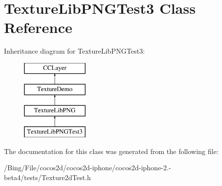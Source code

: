 \hypertarget{interface_texture_lib_p_n_g_test3}{\section{Texture\-Lib\-P\-N\-G\-Test3 Class Reference}
\label{interface_texture_lib_p_n_g_test3}
}
Inheritance diagram for Texture\-Lib\-P\-N\-G\-Test3\-:\begin{figure}[H]
\begin{center}
\leavevmode
\includegraphics[height=4.000000cm]{interface_texture_lib_p_n_g_test3}
\end{center}
\end{figure}


The documentation for this class was generated from the following file\-:\begin{DoxyCompactItemize}
\item 
/\-Bing/\-File/cocos2d/cocos2d-\/iphone/cocos2d-\/iphone-\/2.-\/beta4/tests/Texture2d\-Test.\-h\end{DoxyCompactItemize}
